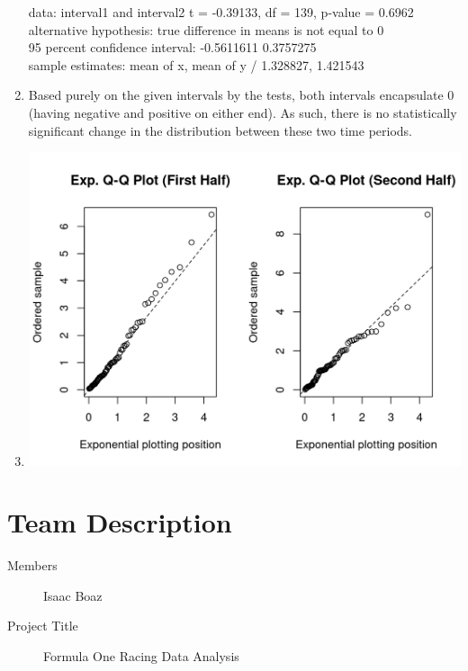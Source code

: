 \documentclass{article}
\begin{document}
\begin{enumerate}
          data:  interval1 and interval2
          t = -0.39133, df = 139, p-value = 0.6962 \\
          alternative hypothesis: true difference in means is not equal to 0 \\
          95 percent confidence interval:
          -0.5611611  0.3757275 \\
          sample estimates:
          mean of x, mean of y /
          1.328827, 1.421543
    \item Based purely on the given intervals by the tests, both intervals encapsulate 0 (having negative and positive on either end). As such, there is no statistically significant change in the distribution between these two time periods.
    \item \includegraphics[options]{q-qplot.png}
\end{enumerate}

\pagebreak
\section*{Team Description}
\begin{description}
    \item[Members] Isaac Boaz
    \item[Project Title] Formula One Racing Data Analysis
\end{description}
\end{document}
